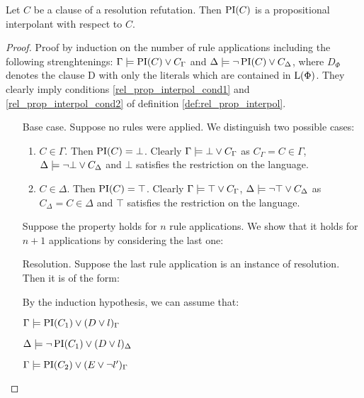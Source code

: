\begin{prop}
	Let $C$ be a clause of a resolution refutation.
	Then $\PI(C)$ is a propositional interpolant with respect to $C$. 
\end{prop}
\begin{proof}
	Proof by induction on the number of rule applications including the following strenghtenings:
	$\Gamma \entails \PI(C) \lor C_\Gamma$ and
	$\Delta \entails \lnot \PI(C) \lor C_\Delta$, where $D_\Phi$ denotes the clause D with only the literals which are contained in $\Lang(\Phi)$. They clearly imply conditions \ref{rel_prop_interpol_cond1} and \ref{rel_prop_interpol_cond2} of definition \ref{def:rel_prop_interpol}. 

\begin{itemize}
	\item[Base case.]
	Suppose no rules were applied. We distinguish two possible cases:
	\begin{enumerate}
		\item $C \in \Gamma$.
			Then $\PI(C) = \bot$. Clearly $\Gamma \entails \bot \lor C_\Gamma$ as $C_\Gamma = C \in \Gamma$, $\Delta \entails \lnot \bot \lor C_\Delta$ and $\bot$ satisfies the restriction on the language.

		\item $C \in \Delta$.
			Then $\PI(C) = \top$. Clearly $\Gamma \entails \top \lor C_\Gamma$, $\Delta \entails \lnot \top \lor C_\Delta$ as $C_\Delta = C \in \Delta$ and $\top$ satisfies the restriction on the language.
	\end{enumerate}

	Suppose the property holds for $n$ rule applications.
	We show that it holds for $n+1$ applications by considering the last one:

\item[Resolution.]
	Suppose the last rule application is an instance of resolution. Then it is of the form:
	\begin{prooftree}
	\end{prooftree}

	By the induction hypothesis, we can assume that:

	$\Gamma \entails \PI(C_1) \lor (D\lor l)_\Gamma$

	$\Delta \entails \lnot \PI(C_1) \lor (D\lor l)_\Delta$

	$\Gamma \entails \PI(C_2) \lor (E\lor \lnot l')_\Gamma$


\end{itemize}
\end{proof}
